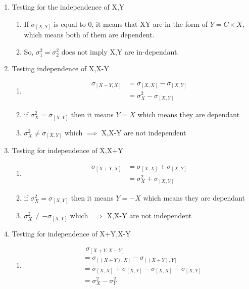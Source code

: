 \documentclass{article}
\begin{document}
\begin{enumerate}
\item \large{Testing for the independence of X,Y}
\begin{enumerate}
\item If $\sigma_{[X,Y]}$ is equal to 0, it means that XY are in the form of $Y = C\times X$, which means both of them are dependent.
\item So, $\sigma_1^2 = \sigma_2^2$ does not imply X,Y are in-dependant.\\
\end{enumerate}

\item \large{Testing independence of X,X-Y}
\begin{enumerate}
\item \begin{align*}
    \sigma_{[X-Y,X]} &= \sigma_{[X,X]} - \sigma_{[X,Y]}\\
                     &= \sigma_{X}^2 - \sigma_{[X,Y]}
\end{align*}
\item if $\sigma_{X}^2 = \sigma_{[X,Y]}$ then it means $Y=X$ which means they are dependant\\
\item $\sigma_{X}^2 \neq \sigma_{[X,Y]}$ which $\implies$ X,X-Y are not independent\\
\end{enumerate}

\item \large Testing for independence of X,X+Y
\begin{enumerate}
\item \begin{align*}
   \sigma_{[X+Y,X]} &= \sigma_{[X,X]} + \sigma_{[X,Y]}\\
                     &= \sigma_{X}^2 + \sigma_{[X,Y]}
\end{align*}
\item if $\sigma_{X}^2 = \sigma_{[X,Y]}$ then it means $Y=-X$ which means they are dependant\\
\item $\sigma_{X}^2 \neq -\sigma_{[X,Y]}$ which $\implies$ X,X-Y are not independent\\
\end{enumerate}
\item \large{Testing for independence of X+Y,X-Y}
\begin{enumerate}
\item \begin{align*}
& \hspace{5pt} \sigma_{[X+Y, X-Y]}\\
&= \sigma_{[(X+Y), X]}- \sigma_{[(X+Y), Y]} \\
&= \sigma_{[X,X]} + \sigma_{[X,Y]} - \sigma_{[X,X]} - \sigma_{[X,Y]}  \\
&= \sigma_X^2 - \sigma_Y^2
\end{align*}


\end{enumerate}
\end{enumerate}
\end{document}
